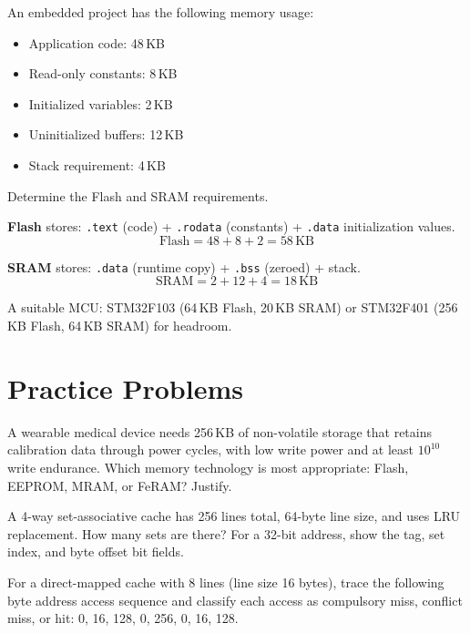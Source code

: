 \begin{example}
An embedded project has the following memory usage:
\begin{itemize}[nosep]
  \item Application code: 48\,KB
  \item Read-only constants: 8\,KB
  \item Initialized variables: 2\,KB
  \item Uninitialized buffers: 12\,KB
  \item Stack requirement: 4\,KB
\end{itemize}
Determine the Flash and SRAM requirements.

\begin{solution}
\textbf{Flash} stores: \texttt{.text} (code) + \texttt{.rodata} (constants) + \texttt{.data} initialization values.
\[
  \text{Flash} = 48 + 8 + 2 = 58\,\text{KB}
\]

\textbf{SRAM} stores: \texttt{.data} (runtime copy) + \texttt{.bss} (zeroed) + stack.
\[
  \text{SRAM} = 2 + 12 + 4 = 18\,\text{KB}
\]

A suitable MCU: STM32F103 (64\,KB Flash, 20\,KB SRAM) or STM32F401 (256\,KB Flash, 64\,KB SRAM) for headroom.
\end{solution}
\end{example}

\section{Practice Problems}
\label{sec:mem:practice}

\begin{exercise}
A wearable medical device needs 256\,KB of non-volatile storage that retains calibration data through power cycles, with low write power and at least $10^{10}$ write endurance. Which memory technology is most appropriate: Flash, EEPROM, MRAM, or FeRAM? Justify.
\end{exercise}

\begin{exercise}
A 4-way set-associative cache has 256 lines total, 64-byte line size, and uses LRU replacement. How many sets are there? For a 32-bit address, show the tag, set index, and byte offset bit fields.
\end{exercise}

\begin{exercise}
For a direct-mapped cache with 8 lines (line size 16 bytes), trace the following byte address access sequence and classify each access as compulsory miss, conflict miss, or hit: 0, 16, 128, 0, 256, 0, 16, 128.
\end{exercise}

